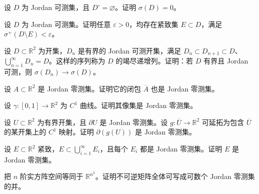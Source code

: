 \noindent\begin{minipage}{\textwidth}
设 $D$ 为 Jordan 可测集，且 $D^\circ=\varnothing$。证明 $\sigma(D)=0$。
\end{minipage}\par\vfill
\noindent\begin{minipage}{\textwidth}
设 $D$ 为 Jordan 可测集。证明任意 $\varepsilon>0$，均存在紧致集 $E\subset D$，满足 $\sigma^+(D\setminus E)<\varepsilon$。
\end{minipage}\par\vfill
\newpage
\noindent\begin{minipage}{\textwidth}
设 $D\subset\mathbb R^2$ 为开集，$D_n$ 是有界的 Jordan 可测开集，满足 $D_n\subset D_{n+1}\subset D$、$\bigcup_{n=1}^{\infty}D_n=D$。这样的序列称为 $D$ 的竭尽递增列。证明：若 $D$ 有界且 Jordan 可测，则 $\sigma(D_n)\to\sigma(D)$。
\end{minipage}\par\vfill
\noindent\begin{minipage}{\textwidth}
设 $A\subset\mathbb R^2$ 是 Jordan 零测集。证明它的闭包 $\overline A$ 也是 Jordan 零测集。
\end{minipage}\par\vfill
\noindent\begin{minipage}{\textwidth}
设 $\gamma:[0,1]\to\mathbb R^2$ 为 $C^1$ 曲线。证明其像集是 Jordan 零测集。
\end{minipage}\par\vfill
\noindent\begin{minipage}{\textwidth}
设 $U\subset\mathbb R^2$ 为有界开集，且 $\partial U$ 是 Jordan 零测集。设 $g:\overline U\to\mathbb R^2$ 可延拓为包含 $\overline U$ 的某开集上的 $C^1$ 映射。证明 $\partial(g(U))$ 是 Jordan 零测集。
\end{minipage}\par\vfill
\newpage
\noindent\begin{minipage}{\textwidth}
设 $E\subset\mathbb R^2$ 紧致，$E\subset\bigcup_{i=1}^{\infty}E_i$，且每个 $E_i$ 都是 Jordan 零测集。证明 $E$ 是 Jordan 零测集。
\end{minipage}\par\vfill
\noindent\begin{minipage}{\textwidth}
把 $n$ 阶实方阵空间等同于 $\mathbb R^{n^2}$。证明不可逆矩阵全体可写成可数个 Jordan 零测集的并。
\end{minipage}\par\vfill
